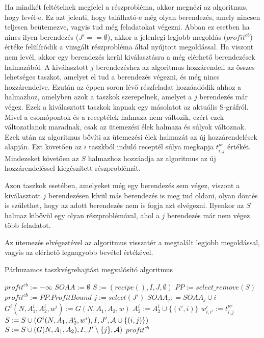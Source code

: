 Ha mindkét feltételnek megfelel a részprobléma, akkor megnézi az algoritmus, hogy levél-e. Ez azt jelenti, hogy található-e még olyan berendezés, amely nincsen teljesen beütemezve, vagyis tud még feladatokat végezni. Abban ez esetben ha nincs ilyen berendezés ($J'== \emptyset$), akkor a jelenlegi legjobb megoldás ($profit^{cb}$) értéke felülíródik a vizsgált részprobléma által nyújtott megoldással. Ha viszont nem levél, akkor egy berendezés kerül kiválasztásra a még elérhető berendezések halmazából. A kiválasztott $j$ berendezéshez az algoritmus hozzárendeli az összes lehetséges taszkot, amelyet el tud a berendezés végezni, és még nincs hozzárendelve. Ezután az éppen soron lévő részfeladat hozzáadódik ahhoz a halmazhoz, amelyben azok a taszkok szerepelnek, amelyet a $j$ berendezés már végez. Ezek a kiválasztott taszkok kapnak egy másolatot az aktuális S-gráfról. Mivel a csomópontok és a receptélek halmaza nem változik, ezért ezek változatlanok maradnak, csak az ütemezési élek halmaza és súlyok változnak. Ezek után az algoritmus bővíti az ütemezési élek halmazát az új hozzárendelések alapján. Ezt követően az $i$ taszkból induló receptél súlya megkapja $t^{pr}_{i,j}$ értékét. Mindezeket követően az $S$ halmazhoz hozzáadja az algoritmus az új hozzárendeléssel kiegészített részproblémát.

Azon taszkok esetében, amelyeket még egy berendezés sem végez, viszont a kiválasztott $j$ berendezésen kívül más berendezés is meg tud oldani, olyan döntés is születhet, hogy az adott berendezés nem is fogja azt elvégezni. Ilyenkor az $S$ halmaz kibővül egy olyan részproblémával, ahol a $j$ berendezés már nem végez több feladatot. 

Az ütemezés elvégeztével az algoritmus visszatér a megtalált legjobb megoldással, vagyis az elérhető legnagyobb bevétel értékével.

\begin{algorithm}[H]
\caption{Párhuzamos taszkvégrehajtást megvalósító algoritmus}
\label{parhuzamos}
\begin{algorithmic}[1]
	\State $profit^{cb}:= -\infty$
	\State $SOAA:= \emptyset$
	\State $S:= {(recipe(),I,J,\emptyset)}$
		\State $PP:= select\_remove(S)$
					\State $profit^{cb}:=PP.ProfitBound$
				\Else
					\State $j:=select(J')$
						\State $SOAA_j: = SOAA_j\cup i$
						\State $G^i(N,A_1^i,A_2^i,w^i):= G(N,A_1,A_2,w)$
							\State $A_2^i:= A_2^i \cup \{(i',i)\}$				
						\EndFor
							\State $w_{i,i'}^i:= t_{i,j}^{pr}$
						\EndFor
						\State $S:= S \cup (G^i(N,A_1,A_2^i,w^i),I,J',{\cal A} \cup \{(i,j)\})$
					\EndFor
						\State $S:= S \cup (G(N,A_1,A_2),I,J'\setminus\{j\},{\cal A})$
					\EndIf					
				\EndIf
			\EndIf
		\EndIf
	\EndWhile
	\State \Return $profit^{cb}$
\EndProcedure
\end{algorithmic}
\end{algorithm}

